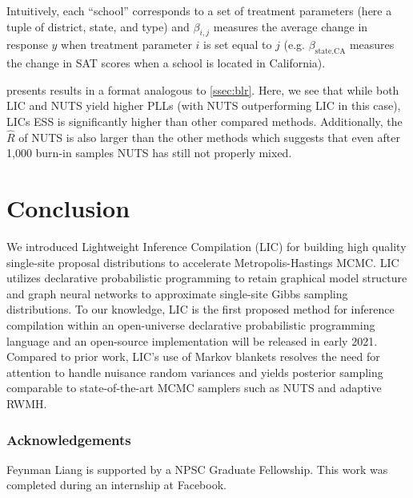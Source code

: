\documentclass[twoside]{article}
\begin{document}
Intuitively, each ``school'' corresponds to a set of treatment parameters
(here a tuple of district, state, and type) and $\beta_{i,j}$ measures the
average change in response $y$ when treatment parameter $i$ is set equal to
$j$ (e.g. $\beta_{\text{state},\text{CA}}$ measures the change in SAT scores
when a school is located in California).

 presents results in a format analogous to
\cref{ssec:blr}. Here, we see that while both LIC and NUTS yield higher PLLs
(with NUTS outperforming LIC in this case), LICs ESS is significantly higher
than other compared methods. Additionally, the $\widehat{R}$ of NUTS is also
larger than the other methods which suggests that even after 1,000 burn-in samples
NUTS has still not properly mixed.

\section{Conclusion}

We introduced Lightweight Inference Compilation (LIC) for building high
quality single-site proposal distributions to accelerate Metropolis-Hastings
MCMC. LIC utilizes declarative probabilistic programming to retain graphical
model structure and graph neural networks to approximate single-site Gibbs
sampling distributions. To our knowledge, LIC is the first proposed method
for inference compilation within an open-universe declarative probabilistic
programming language and an open-source implementation will be released in
early 2021. Compared to prior work, LIC's use of Markov blankets resolves the
need for attention to handle nuisance random variances and yields posterior
sampling comparable to state-of-the-art MCMC samplers such as NUTS and
adaptive RWMH.

\subsubsection*{Acknowledgements}
Feynman Liang is supported by a NPSC Graduate Fellowship.
This work was completed during an internship at Facebook.


\end{document}
